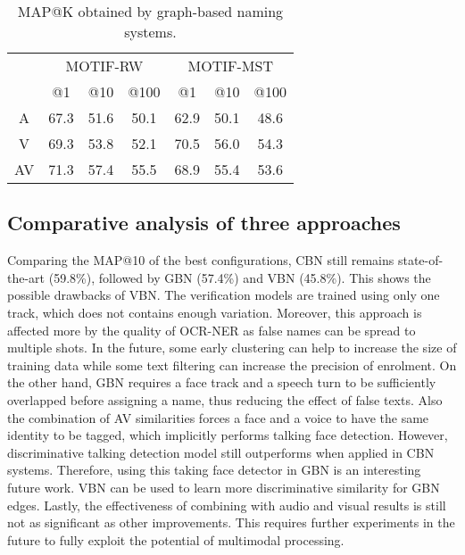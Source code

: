 \begin{table}[tb]
\centering
\vspace*{-5mm}
\caption{MAP@K obtained by graph-based naming systems.}
\vspace*{-2mm}
\begin{tabular}{c|c|c|c|| c|c|c|}
\cline{2-7}
  &  \multicolumn{3}{|c||}{MOTIF-RW} &  \multicolumn{3}{|c|}{MOTIF-MST} \\ \cline{2-7}
           & @1& @10& @100   & @1& @10& @100 \\ \hline
 \multicolumn{1}{|c|}{A} & 67.3 &  51.6 & 50.1  & 62.9 &  50.1 & 48.6\\ \hline
 \multicolumn{1}{|c|}{V} & 69.3  & 53.8 & 52.1 & 70.5  & 56.0 & 54.3\\ \hline
 \multicolumn{1}{|c|}{AV} & 71.3 &  57.4 & 55.5 &  68.9 &  55.4 & 53.6\\ \hline
\end{tabular}
\vspace*{-5mm}
\label{tab:graph}
\end{table}

\subsection{Comparative analysis of three approaches}

Comparing the MAP@10 of the best configurations, CBN still remains state-of-the-art (59.8\%), followed by GBN (57.4\%) and VBN (45.8\%). 
%
This shows the possible drawbacks of VBN. The verification models are trained using only one track, which does not contains enough variation. 
%
Moreover, this approach is affected more by the quality of OCR-NER as false names can be spread to multiple shots. In the future, some early clustering can help to increase the size of training data while some text filtering can increase the precision of enrolment.
%
On the other hand, GBN requires a face track and a speech turn to be sufficiently overlapped before assigning a name, thus reducing the effect of false texts. Also the combination of AV similarities forces a face and a voice to have the same identity to be tagged, which implicitly performs talking face detection.
%
However, discriminative talking detection model still outperforms when applied in CBN systems. Therefore, using this taking face detector in GBN is an interesting future work. 
%
VBN can be used to learn more discriminative similarity for GBN edges.
%
Lastly, the effectiveness of combining with audio and visual results is still not as significant as other improvements. This requires further experiments in the future to fully exploit the potential of multimodal processing.

